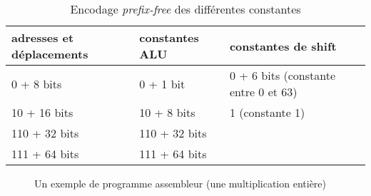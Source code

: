 \documentclass[architecture]{compas2018}
\begin{document}
\begin{table}
  \label{tab:constantes}
  \centering
  \caption{Encodage \emph{prefix-free} des différentes constantes}
  \begin{tabular}{|l||l||l|}
    \hline
    adresses et déplacements & constantes ALU & constantes de shift                   \\
    \hline
    0 + 8 bits              & 0 + 1 bit      & 0 + 6 bits  (constante entre 0 et 63) \\
    \hline         
    10 + 16 bits            & 10 + 8 bits    & 1  (constante 1)                      \\
    \hline                  
    110 + 32 bits           & 110 + 32 bits  &                                       \\
    \hline                  
    111 + 64 bits           & 111 + 64 bits  &                                       \\
    \hline
  \end{tabular}
\end{table}

\begin{figure}
  \caption{Un exemple de programme assembleur (une multiplication entière)}
  \label{fig:exempleasm}
\iffalse
  let r0 17        ; 0111 000 1000010001 ; 000 encode r0,  17 est encodé sur 10 bits
boucle:	                                 ; ceci est une étiquette (label)
  sub2i r0 1       ; 0011 000 01         ; 000 encode r0, 01 encode la constante 1
  jumpif nz boucle ; 1011 001 011100111  ;jumpif nz -25, encodé en 16 bits en tout 
\fi
\end{figure}
\end{document}
